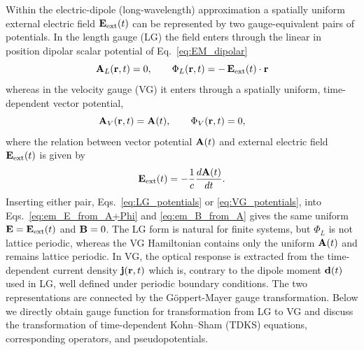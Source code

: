 Within the electric-dipole (long-wavelength) approximation
a spatially uniform external  electric field $\vb{E}_\mathrm{ext}(t)$ can be represented by two
gauge-equivalent pairs of potentials. In the length gauge (LG) the field enters
through the linear in position dipolar scalar potential of Eq.~\eqref{eq:EM_dipolar}
\begin{equation}
\vb{A}_L(\vb{r},t) = 0,  \qquad
	\Phi_L(\vb{r},t) = -\,\vb{E}_\mathrm{ext}(t)\cdot\vb{r}
	  \label{eq:LG_potentials}
\end{equation}
whereas in the velocity gauge (VG) it enters through a spatially uniform,
time-dependent vector potential,
\begin{equation}
  \vb{A}_V(\vb{r},t) = \vb{A}(t), \qquad
  \Phi_V(\vb{r},t) = 0, \qquad
  \label{eq:VG_potentials}
\end{equation}
where the relation between vector potential   $\vb{A}(t)$  and  external electric field $\vb{E}_\mathrm{ext}(t)$  
is given by
\begin{equation}
  \vb{E}_\mathrm{ext}(t) = -\frac{1}{c}\frac{d\vb{A}(t)}{dt}.
\end{equation}
Inserting either pair, Eqs.~\eqref{eq:LG_potentials} or \eqref{eq:VG_potentials},
into Eqs.~\eqref{eq:em_E_from_A+Phi} and \eqref{eq:em_B_from_A}
gives the same uniform $\vb{E}=\vb{E}_\mathrm{ext}(t)$ and $\vb{B}=0$. The LG form is natural
for finite systems, but $\Phi_L$ is not lattice periodic, whereas the VG
Hamiltonian contains only the uniform $\vb{A}(t)$ and remains lattice periodic.
In VG,  the   optical response is extracted  from   the 
  time-dependent current density
$\vb j(\vb r,t)$ which is, contrary to  the dipole moment  $\vb d(t)$ used in LG, 
 well defined under periodic boundary conditions.
The two representations are connected
by the G\"oppert-Mayer gauge transformation.\cite{GoeppertMayer-1931,Mattiat-Luber-2022}
Below we directly obtain gauge function for transformation from LG to VG and discuss the transformation of
time-dependent Kohn--Sham (TDKS) equations, corresponding operators, and pseudopotentials.



